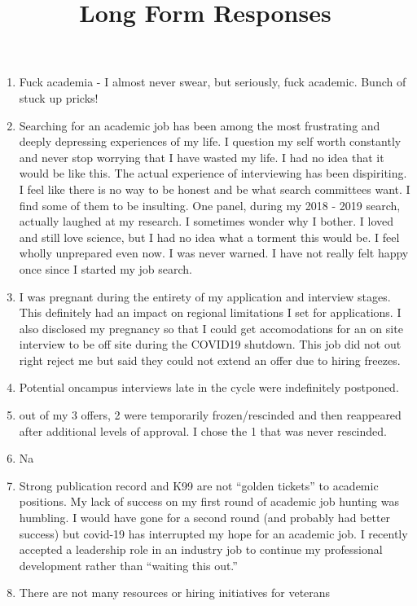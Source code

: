 \documentclass[]{article}
\title{Long Form Responses}
\author{}
\date{\vspace{-2.5em}}
\begin{document}
\maketitle

\begin{enumerate}
\def\labelenumi{\arabic{enumi}.}
\item
  Fuck academia - I almost never swear, but seriously, fuck academic.
  Bunch of stuck up pricks!
\item
  Searching for an academic job has been among the most frustrating and
  deeply depressing experiences of my life. I question my self worth
  constantly and never stop worrying that I have wasted my life. I had
  no idea that it would be like this. The actual experience of
  interviewing has been dispiriting. I feel like there is no way to be
  honest and be what search committees want. I find some of them to be
  insulting. One panel, during my 2018 - 2019 search, actually laughed
  at my research. I sometimes wonder why I bother. I loved and still
  love science, but I had no idea what a torment this would be. I feel
  wholly unprepared even now. I was never warned. I have not really felt
  happy once since I started my job search.
\item
  I was pregnant during the entirety of my application and interview
  stages. This definitely had an impact on regional limitations I set
  for applications. I also disclosed my pregnancy so that I could get
  accomodations for an on site interview to be off site during the
  COVID19 shutdown. This job did not out right reject me but said they
  could not extend an offer due to hiring freezes.
\item
  Potential oncampus interviews late in the cycle were indefinitely
  postponed.
\item
  out of my 3 offers, 2 were temporarily frozen/rescinded and then
  reappeared after additional levels of approval. I chose the 1 that was
  never rescinded.
\item
  Na
\item
  Strong publication record and K99 are not ``golden tickets'' to
  academic positions. My lack of success on my first round of academic
  job hunting was humbling. I would have gone for a second round (and
  probably had better success) but covid-19 has interrupted my hope for
  an academic job. I recently accepted a leadership role in an industry
  job to continue my professional development rather than ``waiting this
  out.''
\item
  There are not many resources or hiring initiatives for veterans

\end{enumerate}
\end{document}
